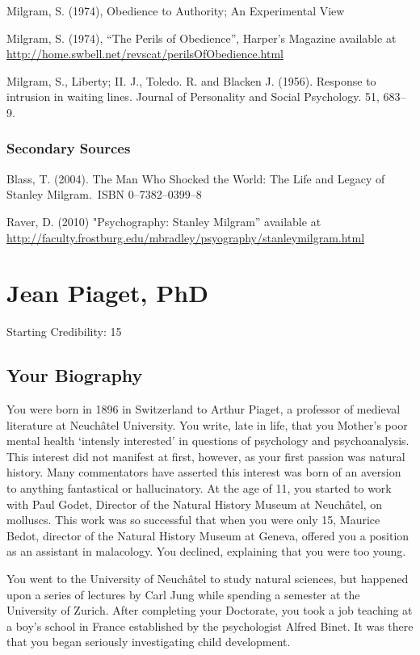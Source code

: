 \begin{refsection}
Milgram, S. (1974), Obedience to Authority; An Experimental View

Milgram, S. (1974), ``The Perils of Obedience'', Harper's Magazine available at \url{http://home.swbell.net/revscat/perilsOfObedience.html}

Milgram, S., Liberty; II. J., Toledo. R. and Blacken J. (1956). Response to intrusion in waiting lines. Journal of Personality and Social Psychology. 51, 683--9.

\subsection{Secondary Sources}
\label{secondarysources}

Blass, T. (2004). The Man Who Shocked the World: The Life and Legacy of Stanley Milgram. ISBN 0--7382--0399--8

Raver, D. (2010) "Psychography: Stanley Milgram” available at \url{http://faculty.frostburg.edu/mbradley/psyography/stanleymilgram.html}

\chapter{Jean Piaget, PhD}
\label{jeanpiagetphd}

Starting Credibility: 15

\section{Your Biography}
\label{yourbiography}

You were born in 1896 in Switzerland to Arthur Piaget, a professor of medieval literature at Neuchâtel University. You write, late in life, that you Mother's poor mental health `intensly interested' in questions of psychology and psychoanalysis. This interest did not manifest at first, however, as your first passion was natural history. Many commentators have asserted this interest was born of an aversion to anything fantastical or hallucinatory. At the age of 11, you started to work with Paul Godet, Director of the Natural History Museum at Neuchâtel, on molluscs. This work was so successful that when you were only 15, Maurice Bedot, director of the Natural History Museum at Geneva, offered you a position as an assistant in malacology. You declined, explaining that you were too young.

You went to the University of Neuchâtel to study natural sciences, but happened upon a series of lectures by Carl Jung while spending a semester at the University of Zurich. After completing your Doctorate, you took a job teaching at a boy's school in France established by the psychologist Alfred Binet. It was there that you began seriously investigating child development.


\end{refsection}
